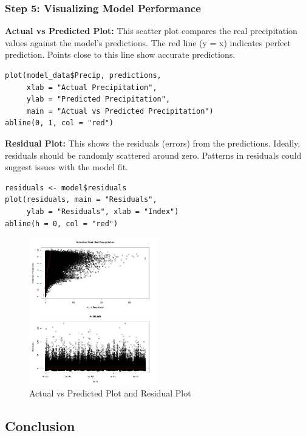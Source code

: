 \subsubsection*{Step 5: Visualizing Model Performance}

\textbf{Actual vs Predicted Plot:} This scatter plot compares the real precipitation values against the model’s predictions. The red line (y = x) indicates perfect prediction. Points close to this line show accurate predictions.

\begin{verbatim}
plot(model_data$Precip, predictions,
     xlab = "Actual Precipitation",
     ylab = "Predicted Precipitation",
     main = "Actual vs Predicted Precipitation")
abline(0, 1, col = "red")
\end{verbatim}

\textbf{Residual Plot:} This shows the residuals (errors) from the predictions. Ideally, residuals should be randomly scattered around zero. Patterns in residuals could suggest issues with the model fit.

\begin{verbatim}
residuals <- model$residuals
plot(residuals, main = "Residuals",
     ylab = "Residuals", xlab = "Index")
abline(h = 0, col = "red")
\end{verbatim}

\begin{figure}[h]
\centering
\includegraphics[width=0.5\textwidth]{figures/pred_residual.jpg}
\caption{Actual vs Predicted Plot and Residual Plot}
\end{figure}

\subsection*{Conclusion}

